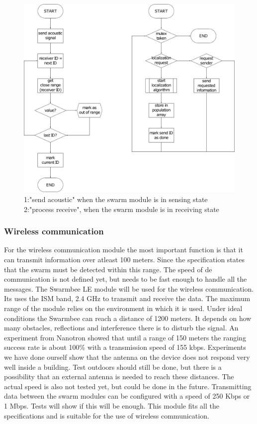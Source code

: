 \documentclass[10pt,a4paper]{article}
\begin{document}
\begin{figure}[H]
   \centering
   \includegraphics[width=\textwidth]{sendre.pdf}
   \caption{1:"send acoustic" when the swarm module is in sensing state 2:"process receive", when the swarm module is in receiving state}
   \label{fig:sendre}
\end{figure}


\subsubsection{Wireless communication}

For the wireless communication module the most important function is that it can transmit information over atleast 100 meters. Since the specification states that the swarm must be detected within this range. The speed of de communication is not defined yet, but needs to be fast enough to handle all the messages. The Swarmbee LE module will be used for the wireless communication. Its uses the ISM band, 2.4 GHz to transmit and receive the data. The maximum range of the module relies on the environment in which it is used. Under ideal conditions the Swarmbee can reach a distance of 1200 meters. It depends on how many obstacles, reflections and interference there is to disturb the signal. An experiment from Nanotron showed that until a range of 150 meters the ranging success rate is about 100\% with a transmission speed of 155 kbps. Experiments we have done ourself show that the antenna on the device does not respond very well inside a building. Test outdoors should still be done, but there is a possibility that an external antenna is needed to reach these distances. The actual speed is also not tested yet, but could be done in the future. Transmitting data between the swarm modules can be configured with a speed of 250 Kbps or 1 Mbps. Tests will show if this will be enough. This module fits all the specifications and is suitable for the use of wireless communication.
\end{document}
